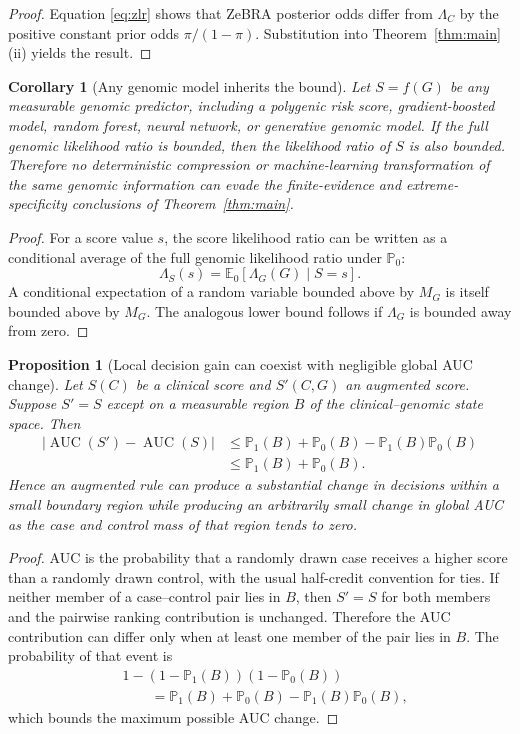 \documentclass[journal]{IEEEtran}
\newtheorem{corollary}{Corollary}
\newtheorem{proposition}{Proposition}
\newcommand{\Pone}{\mathbb{P}_1}
\newcommand{\Pzero}{\mathbb{P}_0}
\newcommand{\LR}{\Lambda}
\begin{document}
\begin{proof}
Equation \eqref{eq:zlr} shows that ZeBRA posterior odds differ from $\LR_C$ by the positive constant prior odds $\pi/(1-\pi)$. Substitution into Theorem~\ref{thm:main}(ii) yields the result.
\end{proof}

\begin{corollary}[Any genomic model inherits the bound]
Let $S=f(G)$ be any measurable genomic predictor, including a polygenic risk score, gradient-boosted model, random forest, neural network, or generative genomic model. If the full genomic likelihood ratio is bounded, then the likelihood ratio of $S$ is also bounded. Therefore no deterministic compression or machine-learning transformation of the same genomic information can evade the finite-evidence and extreme-specificity conclusions of Theorem~\ref{thm:main}.
\end{corollary}

\begin{proof}
For a score value $s$, the score likelihood ratio can be written as a conditional average of the full genomic likelihood ratio under $\Pzero$:
\begin{equation}
\LR_S(s)
=\mathbb{E}_0[\LR_G(G)\mid S=s].
\end{equation}
A conditional expectation of a random variable bounded above by $M_G$ is itself bounded above by $M_G$. The analogous lower bound follows if $\LR_G$ is bounded away from zero.
\end{proof}

\begin{proposition}[Local decision gain can coexist with negligible global AUC change]
\label{prop:auc-local}
Let $S(C)$ be a clinical score and $S'(C,G)$ an augmented score. Suppose $S'=S$ except on a measurable region $B$ of the clinical--genomic state space. Then
\begin{align}
\left|\operatorname{AUC}(S')-\operatorname{AUC}(S)\right|
&\le \Pone(B)+\Pzero(B)-\Pone(B)\Pzero(B)\\
&\le \Pone(B)+\Pzero(B).
\label{eq:auc-local-bound}
\end{align}
Hence an augmented rule can produce a substantial change in decisions within a small boundary region while producing an arbitrarily small change in global AUC as the case and control mass of that region tends to zero.
\end{proposition}

\begin{proof}
AUC is the probability that a randomly drawn case receives a higher score than a randomly drawn control, with the usual half-credit convention for ties. If neither member of a case--control pair lies in $B$, then $S'=S$ for both members and the pairwise ranking contribution is unchanged. Therefore the AUC contribution can differ only when at least one member of the pair lies in $B$. The probability of that event is
\begin{align}
&1-(1-\Pone(B))(1-\Pzero(B))\\
&\qquad=\Pone(B)+\Pzero(B)-\Pone(B)\Pzero(B),
\end{align}
which bounds the maximum possible AUC change.
\end{proof}
\end{document}
